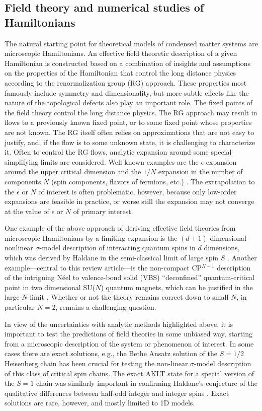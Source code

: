 \documentclass[range]{ar2e}
\begin{document}
\subsection{Field theory and numerical studies of Hamiltonians}

The natural starting point for theoretical models of condensed matter systems are microscopic Hamiltonians.
An effective field theoretic description  of a given Hamiltonian 
is constructed based on a combination of insights and assumptions on the properties of the Hamiltonian that control the long distance physics according to the renormalization group (RG) approach. These properties most famously include symmetry and dimensionality, but more subtle effects like the nature of the topological defects also play an important role.  The fixed points of the field theory control the long distance physics.
The RG approach may result in flows to a previously known fixed point, or to some fixed point
whose properties are not known. The RG itself often relies on approximations that are not easy
to justify, and, if the flow is to some unknown state, it is challenging to characterize it. 
Often to control the RG flows, analytic expansion around some special simplifying limits are considered. Well known examples are the $\epsilon$ expansion
around the upper critical dimension and the $1/N$ expansion in the number of components $N$ (spin components, flavors of fermions, etc.)
\cite{herbut2007:book,barber1972:lgNeps}. The
extrapolation to the $\epsilon$ or $N$ of interest is often problematic, however, because only low-order
expansions are feasible in practice, or worse still the expansion may not converge at the value of $\epsilon$ or $N$ of primary interest.

One example of the above approach of deriving effective field theories from microscopic Hamiltonians by a limiting expansion is the $(d+1)$-dimensional
nonlinear $\sigma$-model description of interacting quantum spins in $d$ dimensions, which was derived by Haldane in 
the semi-classical limit of large spin $S$ \cite{Haldane83,Chakravarty89,Auerbach94}.  Another example---central to this review article---is the 
non-compact CP$^{N-1}$ description of the intriguing  N\'eel to valence-bond solid (VBS) ``deconfined'' quantum-critical point in two dimensional 
SU($N$) quantum magnets, which can be justified in the large-$N$ limit \cite{Senthil04a,Sachdev08}. Whether or not the theory remains correct down to 
small $N$, in particular $N=2$, remains a challenging question.

In view of the uncertainties with analytic methods highlighted above, it is important to test the predictions of field theories in some unbiased way,
starting from a microscopic description of the system or phenomenon of interest. In some cases there are exact solutions, 
e.g., the Bethe Ansatz solution of the $S=1/2$ Heisenberg chain \cite{Bethe31} has been crucial for testing 
the non-linear $\sigma$-model description of this class of critical spin chains. The exact AKLT state \cite{affleck88} for a special 
version of the $S=1$ chain was similarly important in confirming Haldane's conjecture of the qualitative differences between 
half-odd integer and integer spins \cite{Haldane83}. Exact solutions are rare, however, and mostly limited to 1D models.
 
\end{document}

